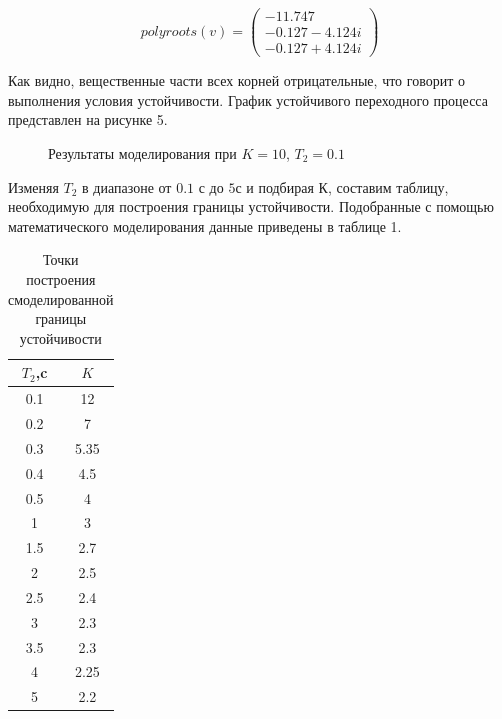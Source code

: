 \documentclass[a4paper, 11pt]{article}
\begin{document}
\begin{equation}
polyroots(v)=\left(
\begin{matrix}
-11.747 \\
-0.127-4.124i \\
-0.127+4.124i 
\end{matrix}
\right)
\end{equation}

\par 
Как видно, вещественные части всех корней отрицательные, что говорит о выполнения условия устойчивости. График устойчивого переходного процесса представлен на рисунке 5. 

\begin{figure}[h!]
\centering
{}
\caption{Результаты моделирования при $K=10$, $T_2=0.1$}
\end{figure}

\par 
Изменяя $T_2$ в диапазоне от $0.1$ с до $5 с$ и подбирая $К$, составим таблицу, необходимую  для построения границы устойчивости. Подобранные с помощью математического моделирования данные приведены в таблице 1.

\newpage
\begin{table}
\caption{Точки построения смоделированной границы устойчивости}
\begin{tabular}{|c|c|}
\hline
$T_2$,c & $K$ \\
\hline
0.1 & 12 \\
\hline
0.2 & 7 \\
\hline
0.3 & 5.35 \\
\hline
0.4 & 4.5 \\
\hline
0.5 & 4 \\
\hline
1 & 3 \\
\hline
1.5 & 2.7 \\
\hline
2 & 2.5 \\
\hline
2.5 & 2.4 \\
\hline
3 & 2.3 \\
\hline
3.5 & 2.3 \\
\hline
4 & 2.25 \\
\hline
5 & 2.2 \\
\hline
\end{tabular}
\end{table}
\end{document}
